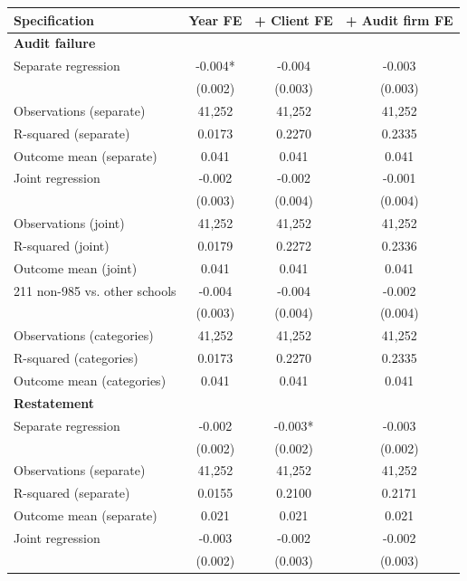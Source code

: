 \documentclass[10pt]{article}
\begin{document}
\begin{minipage}{19cm}\fontsize{10}{12}\selectfont\setlength{\tabcolsep}{4pt}\renewcommand{\arraystretch}{1.12}


\centering
{}
\begin{threeparttable}
\begin{tabular}{p{}ccc}
\toprule
Specification & Year FE & + Client FE & + Audit firm FE \\
\midrule
\multicolumn{4}{l}{\textbf{Audit failure}} \\
Separate regression & -0.004* & -0.004 & -0.003 \\
 & (0.002) & (0.003) & (0.003) \\
Observations (separate) & 41,252 & 41,252 & 41,252 \\
R-squared (separate) & 0.0173 & 0.2270 & 0.2335 \\
Outcome mean (separate) & 0.041 & 0.041 & 0.041 \\
Joint regression & -0.002 & -0.002 & -0.001 \\
 & (0.003) & (0.004) & (0.004) \\
Observations (joint) & 41,252 & 41,252 & 41,252 \\
R-squared (joint) & 0.0179 & 0.2272 & 0.2336 \\
Outcome mean (joint) & 0.041 & 0.041 & 0.041 \\
211 non-985 vs. other schools & -0.004 & -0.004 & -0.002 \\
 & (0.003) & (0.004) & (0.004) \\
Observations (categories) & 41,252 & 41,252 & 41,252 \\
R-squared (categories) & 0.0173 & 0.2270 & 0.2335 \\
Outcome mean (categories) & 0.041 & 0.041 & 0.041 \\
\multicolumn{4}{l}{\textbf{Restatement}} \\
Separate regression & -0.002 & -0.003* & -0.003 \\
 & (0.002) & (0.002) & (0.002) \\
Observations (separate) & 41,252 & 41,252 & 41,252 \\
R-squared (separate) & 0.0155 & 0.2100 & 0.2171 \\
Outcome mean (separate) & 0.021 & 0.021 & 0.021 \\
Joint regression & -0.003 & -0.002 & -0.002 \\
 & (0.002) & (0.003) & (0.003) \\

\end{tabular}
\end{threeparttable}
\end{minipage}
\end{document}
